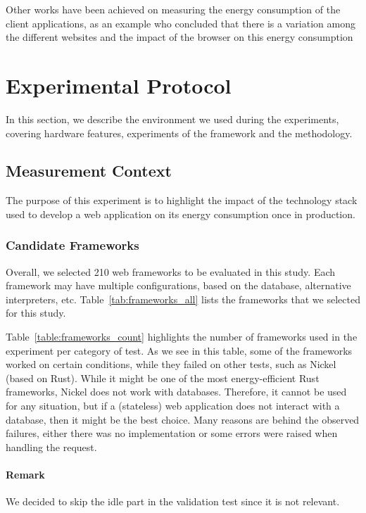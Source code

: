 Other works have been achieved on measuring the energy consumption of the client applications, as an example \cite{philippot_characterization_2014} who concluded that there is a variation among the different websites and the impact of the browser on this energy consumption

\newcommand\duration{20}
\newcommand\parallelclient{512}
\section{Experimental Protocol}
In this section, we describe the environment we used during the experiments, covering hardware features, experiments of the framework and the methodology.

\subsection{Measurement Context}
The purpose of this experiment is to highlight the impact of the technology stack used to develop a web application on its energy consumption once in production.
\subsubsection{Candidate Frameworks}
Overall, we selected 210 web frameworks to be evaluated in this study.
Each framework may have multiple configurations, based on the database, alternative interpreters, etc.
Table~\ref{tab:frameworks_all} lists the frameworks that we selected for this study.

% 
Table~\ref{table:frameworks_count} highlights the number of frameworks used in the experiment per category of test.
As we see in this table, some of the frameworks worked on certain conditions, while they failed on other tests, such as Nickel (based on Rust).
While it might be one of the most energy-efficient Rust frameworks, Nickel does not work with databases.
Therefore, it cannot be used for any situation, but if a (stateless) web application does not interact with a database, then it might be the best choice.
Many reasons are behind the observed failures, either there was no implementation or some errors were raised when handling the request.

\paragraph{Remark}
We decided to skip the idle part in the validation test since it is not relevant.

